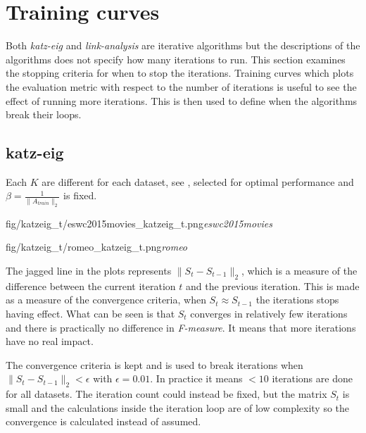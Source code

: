 
\section{Training curves}\label{sec:graphs:training_curves}

Both \textit{katz-eig} and \textit{link-analysis} are iterative algorithms but the descriptions of the algorithms does not specify how many iterations to run. This section examines the stopping criteria for when to stop the iterations.  Training curves which plots the evaluation metric with respect to the number of iterations is useful to see the effect of running more iterations. This is then used to define when the algorithms break their loops.

\newpage

\subsection{katz-eig}\label{sec:training:katz}

Each $K$ are different for each dataset, see , selected for optimal performance and $\beta = \frac{1}{\|A_{train}\|_2}$ is fixed.

\FloatBarrier

{fig/katzeig_t/eswc2015movies_katzeig_t.png}{\textit{eswc2015movies}}

{fig/katzeig_t/romeo_katzeig_t.png}{\textit{romeo}}

The jagged line in the plots represents $\|S_t - S_{t - 1}\|_2$, which is a measure of the difference between the current iteration $t$ and the previous iteration. This is made as a measure of the convergence criteria, when $S_t \approx S_{t - 1}$ the iterations stops having effect. What can be seen is that $S_t$ converges in relatively few iterations and there is practically no difference in \textit{F-measure}. It means that more iterations have no real impact.

\FloatBarrier %

The convergence criteria is kept and is used to break iterations when $\|S_t - S_{t - 1}\|_2 < \epsilon$ with $\epsilon = 0.01$. In practice it means $< 10$ iterations are done for all datasets. The iteration count could instead be fixed, but the matrix $S_t$ is small and the calculations inside the iteration loop are of low complexity so the convergence is calculated instead of assumed.

